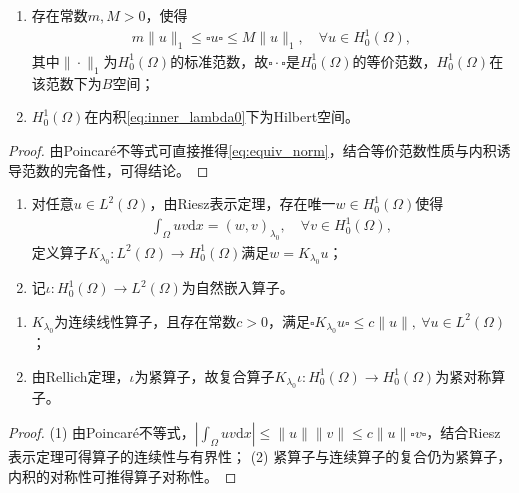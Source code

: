 \documentclass[../../main.tex]{subfiles}%
\begin{document}
\begin{proposition}
\begin{enumerate}[(1)]
\item 存在常数$m,M>0$，使得
\begin{align}
m\|u\|_1\leqslant\square u\square\leqslant M\|u\|_1,\quad \forall u\in H_0^1(\Omega),
\label{eq:equiv_norm}
\end{align}
其中$\|\cdot\|_1$为$H_0^1(\Omega)$的标准范数，故$\square\cdot\square$是$H_0^1(\Omega)$的等价范数，$H_0^1(\Omega)$在该范数下为$B$空间；
\item $H_0^1(\Omega)$在内积\eqref{eq:inner_lambda0}下为Hilbert空间。
\end{enumerate}
\end{proposition}
\begin{proof}
由Poincaré不等式可直接推得\eqref{eq:equiv_norm}，结合等价范数性质与内积诱导范数的完备性，可得结论。
\end{proof}

\begin{definition}
\begin{enumerate}[(1)]
\item 对任意$u\in L^2(\Omega)$，由Riesz表示定理，存在唯一$w\in H_0^1(\Omega)$使得
\begin{align}
\int_{\Omega}uv\mathrm{d}x=(w,v)_{\lambda_0},\quad \forall v\in H_0^1(\Omega),
\label{eq:riesz_rep}
\end{align}
定义算子$K_{\lambda_0}:L^2(\Omega)\to H_0^1(\Omega)$满足$w=K_{\lambda_0}u$；
\item 记$\iota:H_0^1(\Omega)\to L^2(\Omega)$为自然嵌入算子。
\end{enumerate}
\end{definition}

\begin{proposition}
\begin{enumerate}[(1)]
\item $K_{\lambda_0}$为连续线性算子，且存在常数$c>0$，满足$\square K_{\lambda_0}u\square\leqslant c\|u\|,\ \forall u\in L^2(\Omega)$；
\item 由Rellich定理，$\iota$为紧算子，故复合算子$K_{\lambda_0}\iota:H_0^1(\Omega)\to H_0^1(\Omega)$为紧对称算子。
\end{enumerate}
\end{proposition}
\begin{proof}
(1) 由Poincaré不等式，$\left|\int_{\Omega}uv\mathrm{d}x\right|\leqslant\|u\|\|v\|\leqslant c\|u\|\square v\square$，结合Riesz表示定理可得算子的连续性与有界性；
(2) 紧算子与连续算子的复合仍为紧算子，内积的对称性可推得算子对称性。
\end{proof}
\end{document}
